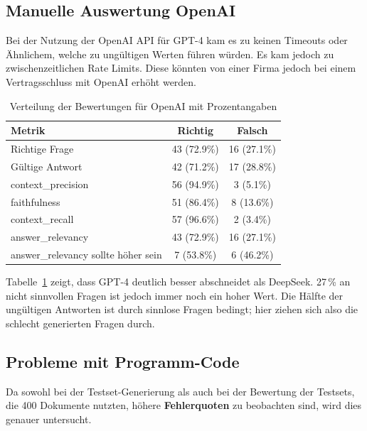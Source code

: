 \subsection{Manuelle Auswertung OpenAI}
Bei der Nutzung der OpenAI API für GPT-4 kam es zu keinen Timeouts oder Ähnlichem, welche zu ungültigen Werten führen würden.
Es kam jedoch zu zwischenzeitlichen Rate Limits.
Diese könnten von einer Firma jedoch bei einem Vertragsschluss mit OpenAI erhöht werden.

\begin{table}[h!]
    \centering
    \caption[OpenAI Verteilung der Bewertungen]{Verteilung der Bewertungen für OpenAI mit Prozentangaben}
    \begin{tabular}{|l|c|c|}
    \hline
    \textbf{Metrik} & \textbf{Richtig} & \textbf{Falsch} \\
    \hline
    Richtige Frage                        & 43 (72.9\%) & 16 (27.1\%) \\
    Gültige Antwort                       & 42 (71.2\%) & 17 (28.8\%) \\
    context\_precision           & 56 (94.9\%) & 3 (5.1\%) \\
    faithfulness                 & 51 (86.4\%) & 8 (13.6\%) \\
    context\_recall              & 57 (96.6\%) & 2 (3.4\%) \\
    answer\_relevancy            & 43 (72.9\%) & 16 (27.1\%) \\
    answer\_relevancy sollte höher sein  & 7 (53.8\%)  & 6 (46.2\%) \\
    \hline
    \end{tabular}
    \label{tab:openai_evaluation}
\end{table}

Tabelle~\ref{tab:openai_evaluation} zeigt, dass GPT-4 deutlich besser abschneidet als DeepSeek. 27\,\% an nicht sinnvollen Fragen ist jedoch immer noch ein hoher Wert.
Die Hälfte der ungültigen Antworten ist durch sinnlose Fragen bedingt; hier ziehen sich also die schlecht generierten Fragen durch.

\subsection{Probleme mit Programm-Code}
Da sowohl bei der Testset-Generierung als auch bei der Bewertung der Testsets, die 400 Dokumente nutzten, höhere \textbf{Fehlerquoten} zu beobachten sind, wird dies genauer untersucht.

